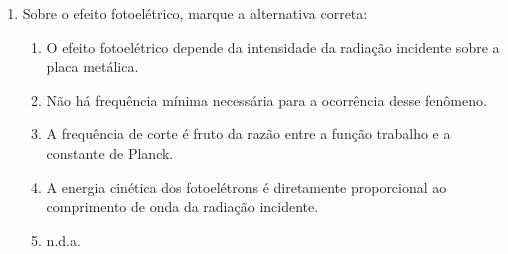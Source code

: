 \documentclass[12pt,letterpaper,fleqn]{article}
\begin{document}
\begin{enumerate}
\item Sobre o efeito fotoelétrico, marque a alternativa correta:
\begin{enumerate}
    \item O efeito fotoelétrico depende da intensidade da radiação incidente sobre a placa metálica.
    \item Não há frequência mínima necessária para a ocorrência desse fenômeno.
    \item A frequência de corte é fruto da razão entre a função trabalho e a constante de Planck.
    \item A energia cinética dos fotoelétrons é diretamente proporcional ao comprimento de onda da radiação incidente.
    \item n.d.a.
\end{enumerate}
\end{enumerate}
\newpage
\end{document}
